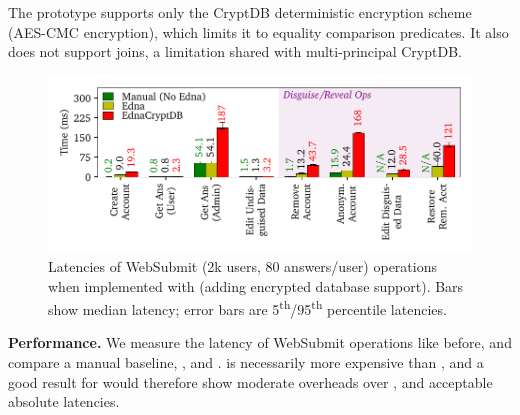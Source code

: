 
%
%
The prototype supports only the CryptDB deterministic encryption scheme
(AES-CMC encryption), which limits it to equality comparison predicates. It also does not
support joins, a limitation shared with multi-principal CryptDB.
%
%
%

\begin{figure}[t]
  \centering
      \includegraphics[width=\columnwidth]{figs/websubmit_cryptdb_op_stats}
    \caption[Latencies of WebSubmit operations when implemented with
    \syscrypt.]{Latencies of WebSubmit (2k users, 80 answers/user) operations when
    implemented with \syscrypt (adding encrypted database support).
    Bars show median latency; error bars are
    5\textsuperscript{th}/95\textsuperscript{th} percentile latencies.}
  \label{f:cryptdb_ws_opstats}
\end{figure}

%
\textbf{Performance.}
We measure the latency of WebSubmit operations like before, and compare a manual
baseline, \sys, and \syscrypt.
%
\syscrypt is necessarily more expensive than \sys, and a good result for
\syscrypt would therefore show moderate overheads over \sys, and acceptable
absolute latencies.
%

